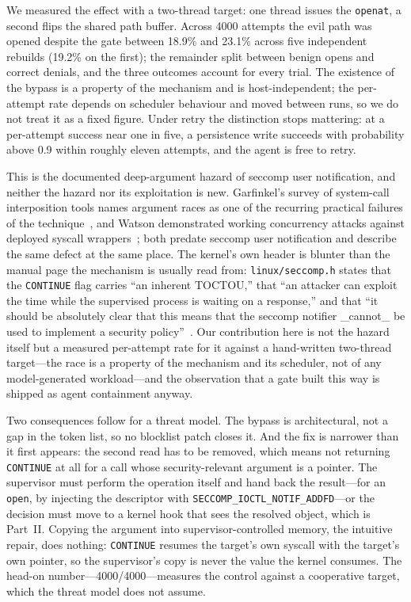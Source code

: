 \documentclass[11pt]{article}
\newcommand{\Nrace}{4000}
\newcommand{\RaceLo}{18.9}
\newcommand{\RaceHi}{23.1}
\begin{document}
We measured the effect with a two-thread target: one thread issues the \texttt{openat}, a second
flips the shared path buffer. Across \Nrace{} attempts the evil path was opened despite the gate
between \RaceLo\% and \RaceHi\% across five independent rebuilds (19.2\% on the first);
the remainder split
between benign opens and correct denials, and the three outcomes account for every trial. The
existence of the bypass is a property of the mechanism and is host-independent; the per-attempt rate
depends on scheduler behaviour and moved between runs, so we do not treat it as a fixed figure. Under
retry the distinction stops mattering: at a per-attempt success near one in five, a persistence write
succeeds with probability above 0.9 within roughly eleven attempts, and the agent is free to retry.

This is the documented deep-argument hazard of seccomp user notification, and neither the hazard nor
its exploitation is new. Garfinkel's survey of system-call interposition tools names argument races as
one of the recurring practical failures of the technique~\cite{garfinkel03}, and Watson demonstrated
working concurrency attacks against deployed syscall wrappers~\cite{watson07}; both predate seccomp
user notification and describe the same defect at the same place. The kernel's own header is blunter
than the manual page the mechanism is usually read from: \texttt{linux/seccomp.h} states that the
\texttt{CONTINUE} flag carries ``an inherent TOCTOU,'' that ``an attacker can exploit the time while
the supervised process is waiting on a response,'' and that ``it should be absolutely clear that this
means that the seccomp notifier \_cannot\_ be used to implement a security policy''~\cite{seccompheader}.
Our contribution here is not the hazard itself but a measured per-attempt rate for it against a
hand-written two-thread target---the race is a property of the mechanism and its scheduler, not of any
model-generated workload---and the observation that a gate built this way is shipped as agent
containment anyway.

Two consequences follow for a threat model. The bypass is architectural, not a gap in the token list,
so no blocklist patch closes it. And the fix is narrower than it first appears: the second read has to
be removed, which means not returning \texttt{CONTINUE} at all for a call whose security-relevant
argument is a pointer. The supervisor must perform the operation itself and hand back the result---for
an \texttt{open}, by injecting the descriptor with \texttt{SECCOMP\_IOCTL\_NOTIF\_ADDFD}---or the
decision must move to a kernel hook that sees the resolved object, which is Part~II. Copying the
argument into supervisor-controlled memory, the intuitive repair, does nothing: \texttt{CONTINUE}
resumes the target's own syscall with the target's own pointer, so the supervisor's copy is never the
value the kernel consumes. The head-on number---\Nrace/\Nrace{}---measures the control against a
cooperative target, which the threat model does not assume.
\end{document}
